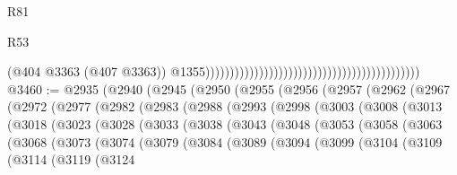 \begin{lexlean}{R81}
\begin{lexlean}{R53}
\begin{coremodule}
{{{{{{{{{{{{{{{{{{{{{{{{{{{{{{{{{{{{{{{{{{{{{{{{{{{{{{{{{{{{{{{{{{{{{{{{{{{{{{{{{{{{{{{{{{{{{{{{{{{{{{{{{{{{{{{{                                                                                            (@404
                                                                                              @3363
                                                                                              (@407
                                                                                                @3363))
                                                                                            @1355))))))))))))))))))))))))))))))))))))))))))))
@3460 := @2935
    (@2940
      (@2945
        (@2950
          (@2955
            (@2956
              (@2957
                (@2962
                  (@2967
                    (@2972
                      (@2977
                        (@2982
                          (@2983
                            (@2988
                              (@2993
                                (@2998
                                  (@3003
                                    (@3008
                                      (@3013
                                        (@3018
                                          (@3023
                                            (@3028
                                              (@3033
                                                (@3038
                                                  (@3043
                                                    (@3048
                                                      (@3053
                                                        (@3058
                                                          (@3063
                                                            (@3068
                                                              (@3073
                                                                (@3074
                                                                  (@3079
                                                                    (@3084
                                                                      (@3089
                                                                        (@3094
                                                                          (@3099
                                                                            (@3104
                                                                              (@3109
                                                                                (@3114
                                                                                  (@3119
                                                                                    (@3124
}}}}}}}}}}}}}}}}}}}}}}}}}}}}}}}}}}}}}}}}}}}}}}}}}}}}}}}}}}}}}}}}}}}}}}}}}}}}}}}}}}}}}}}}}}}}}}}}}}}}}}}}}}}}}}}}
\end{coremodule}
\end{lexlean}
\end{lexlean}
